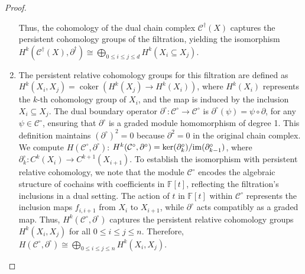 \begin{proof}
\begin{enumerate}
Thus, the cohomology of the dual chain complex \( \mathcal{C}^\dagger(X) \) captures the persistent cohomology groups of the filtration, yielding the isomorphism $H^k(\mathcal{C}^\dagger(X), \partial^\dagger) \cong \bigoplus_{0 \leq i \leq j \leq d} H^k(X_i \subseteq X_j)$.
\item The persistent relative cohomology groups for this filtration are defined as $H^k(X_i, X_j) = \operatorname{coker} \left( H^k(X_j) \to H^k(X_i) \right)$, where \( H^k(X_i) \) represents the \( k \)-th cohomology group of \( X_i \), and the map is induced by the inclusion \( X_i \subseteq X_j \). The dual boundary operator \( \partial^\circ: \mathcal{C}^\circ \to \mathcal{C}^\circ \) is $\partial^\circ(\psi) = \psi \circ \partial$, for any \( \psi \in \mathcal{C}^\circ \), ensuring that \( \partial^\circ \) is a graded module homomorphism of degree 1. This definition maintains \( (\partial^\circ)^2 = 0 \) because \( \partial^2 = 0 \) in the original chain complex. We compute \( H(\mathcal{C}^\circ, \partial^\circ) \): $H^k(\mathcal{C}^\circ, \partial^\circ) = \ker(\partial^\circ_k) / \mathrm{im}(\partial^\circ_{k-1})$, where \( \partial^\circ_k: C^k(X_i) \to C^{k+1}(X_{i+1}) \). To establish the isomorphism with persistent relative cohomology, we note that the module \( \mathcal{C}^\circ \) encodes the algebraic structure of cochains with coefficients in \( \mathbb{F}[t] \), reflecting the filtration's inclusions in a dual setting. The action of \( t \) in \( \mathbb{F}[t] \) within \( \mathcal{C}^\circ \) represents the inclusion maps \( f_{i,i+1} \) from \( X_i \) to \( X_{i+1} \), while \( \partial^\circ \) acts compatibly as a graded map. Thus, \( H^k(\mathcal{C}^\circ, \partial^\circ) \) captures the persistent relative cohomology groups \( H^k(X_i, X_j) \) for all \( 0 \leq i \leq j \leq n \). Therefore, $H(\mathcal{C}^\circ, \partial^\circ) \cong \bigoplus_{0 \leq i \leq j \leq n} H^k(X_i, X_j)$.

\end{enumerate}
\end{proof}
